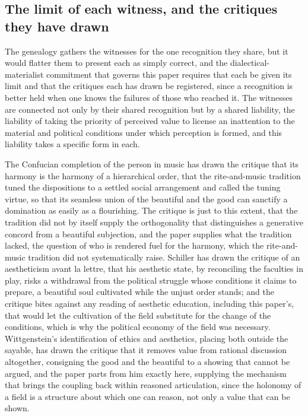 \subsection{The limit of each witness, and the critiques they have drawn}
\label{p22:sub:gen-limits}

The genealogy gathers the witnesses for the one recognition they share, but it would flatter them to present each as simply correct, and the dialectical-materialist commitment that governs this paper requires that each be given its limit and that the critiques each has drawn be registered, since a recognition is better held when one knows the failures of those who reached it. The witnesses are connected not only by their shared recognition but by a shared liability, the liability of taking the priority of perceived value to license an inattention to the material and political conditions under which perception is formed, and this liability takes a specific form in each.

The Confucian completion of the person in music has drawn the critique that its harmony is the harmony of a hierarchical order, that the rite-and-music tradition tuned the dispositions to a settled social arrangement and called the tuning virtue, so that its seamless union of the beautiful and the good can sanctify a domination as easily as a flourishing. The critique is just to this extent, that the tradition did not by itself supply the orthogonality that distinguishes a generative concord from a beautiful subjection, and the paper supplies what the tradition lacked, the question of who is rendered fuel for the harmony, which the rite-and-music tradition did not systematically raise. Schiller has drawn the critique of an aestheticism avant la lettre, that his aesthetic state, by reconciling the faculties in play, risks a withdrawal from the political struggle whose conditions it claims to prepare, a beautiful soul cultivated while the unjust order stands; and the critique bites against any reading of aesthetic education, including this paper's, that would let the cultivation of the field substitute for the change of the conditions, which is why the political economy of the field was necessary. Wittgenstein's identification of ethics and aesthetics, placing both outside the sayable, has drawn the critique that it removes value from rational discussion altogether, consigning the good and the beautiful to a showing that cannot be argued, and the paper parts from him exactly here, supplying the mechanism that brings the coupling back within reasoned articulation, since the holonomy of a field is a structure about which one can reason, not only a value that can be shown.

